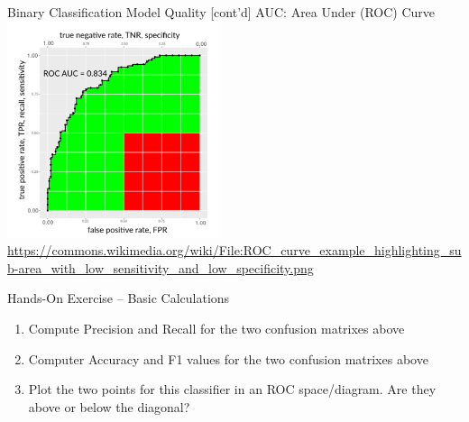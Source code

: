 \documentclass[ignorenonframetext,xcolor=x11names]{beamer}
\begin{document}
\begin{frame}{Binary Classification Model Quality \small [cont'd]}
\large AUC: Area Under (ROC) Curve \\

\normalsize
\centering
\includegraphics[height=2.5in]{auc.png}
\scriptsize \url{https://commons.wikimedia.org/wiki/File:ROC_curve_example_highlighting_sub-area_with_low_sensitivity_and_low_specificity.png}
\end{frame}

\begin{frame}{Hands-On Exercise -- Basic Calculations}
\begin{enumerate}
  \item Compute Precision and Recall for the two confusion matrixes above
  \item Computer Accuracy and F1 values for the two confusion matrixes above
  \item Plot the two points for this classifier in an ROC space/diagram. Are they above or below the diagonal?
\end{enumerate}
\end{frame}

\end{document}
